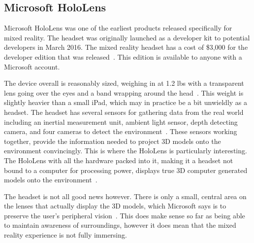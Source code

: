 \documentclass[10pt,draftclsnofoot,onecolumn,letterpaper]{IEEEtran}
\begin{document}
\subsection{Microsoft HoloLens}
Microsoft HoloLens was one of the earliest products released specifically for mixed reality. The headset was originally launched as a developer kit to potential developers in March 2016. The mixed reality headset has a cost of \$3,000 for the developer edition that was released~\cite{HL}. This edition is available to anyone with a Microsoft account.\par
The device overall is reasonably sized, weighing in at 1.2 lbs with a transparent lens going over the eyes and a band wrapping around the head~\cite{HLspecs}. This weight is slightly heavier than a small iPad, which may in practice be a bit unwieldly as a headset. The headset has several sensors for gathering data from the real world including an inertial measurement unit, ambient light sensor, depth detecting camera, and four cameras to detect the environment~\cite{HL}. These sensors working together, provide the information needed to project 3D models onto the environment convincingly. This is where the HoloLens is particularly interesting. The HoloLens with all the hardware packed into it, making it a headset not bound to a computer for processing power, displays true 3D computer generated models onto the environment~\cite{HL}.\par
The headset is not all good news however. There is only a small, central area on the lenses that actually display the 3D models, which Microsoft says is to preserve the user's peripheral vision~\cite{HLpromo}. This does make sense so far as being able to maintain awareness of surroundings, however it does mean that the mixed reality experience is not fully immersing.\par
\end{document}
